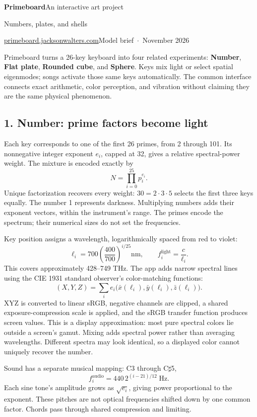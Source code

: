 \documentclass[11pt,letterpaper]{article}
\begin{document}
{\LARGE\bfseries Primeboard}\hfill{\small An interactive art project}\par
{\large Numbers, plates, and shells}\par
\href{https://primeboard.jacksonwalters.com/}{primeboard.jacksonwalters.com}\hfill{\small Model brief \,$\cdot$\, November 2026}

Primeboard turns a 26-key keyboard into four related experiments: \textbf{Number}, \textbf{Flat plate}, \textbf{Rounded cube}, and \textbf{Sphere}. Keys mix light or select spatial eigenmodes; songs activate those same keys automatically. The common interface connects exact arithmetic, color perception, and vibration without claiming they are the same physical phenomenon.

\subsection{1. Number: prime factors become light}
Each key corresponds to one of the first 26 primes, from 2 through 101. Its nonnegative integer exponent \(e_i\), capped at 32, gives a relative spectral-power weight. The mixture is encoded exactly by
\[
 N=\prod_{i=0}^{25}p_i^{e_i}.
\]
Unique factorization recovers every weight: \(30=2\cdot3\cdot5\) selects the first three keys equally. The number 1 represents darkness. Multiplying numbers adds their exponent vectors, within the instrument's range. The primes encode the spectrum; their numerical sizes do not set the frequencies.

Key position assigns a wavelength, logarithmically spaced from red to violet:
\[
 \ell_i=700\left(\frac{400}{700}\right)^{i/25}\!\mathrm{nm},
 \qquad f_i^{\mathrm{light}}=\frac{c}{\ell_i}.
\]
This covers approximately 428--749 THz. The app adds narrow spectral lines using the CIE 1931 standard observer's color-matching functions:
\[
 (X,Y,Z)=\sum_i e_i\bigl(\bar x(\ell_i),\bar y(\ell_i),\bar z(\ell_i)\bigr).
\]
XYZ is converted to linear sRGB, negative channels are clipped, a shared exposure-compression scale is applied, and the sRGB transfer function produces screen values. This is a display approximation: most pure spectral colors lie outside a screen's gamut. Mixing adds spectral power rather than averaging wavelengths. Different spectra may look identical, so a displayed color cannot uniquely recover the number.

Sound has a separate musical mapping: C3 through C\(\sharp\)5,
\[
 f_i^{\mathrm{audio}}=440\,2^{(i-21)/12}\;\mathrm{Hz}.
\]
Each sine tone's amplitude grows as \(\sqrt{e_i}\), giving power proportional to the exponent. These pitches are not optical frequencies shifted down by one common factor. Chords pass through shared compression and limiting.
\end{document}
